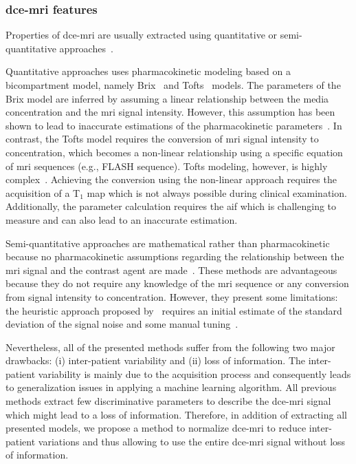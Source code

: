 \documentclass[a4paper,num-refs]{wiley-article}
\begin{document}
\subsubsection{\acs*{dce}-\acs*{mri} features}

Properties of \ac{dce}-\ac{mri} are usually extracted using quantitative or
semi-quantitative approaches~\cite{lemaitre2015computer}.

Quantitative approaches uses pharmacokinetic modeling based on a
bicompartment model, namely Brix~\cite{brix1991pharmacokinetic} and
Tofts~\cite{tofts1995quantitative} models. The parameters of the Brix model
are inferred by assuming a linear relationship between the media concentration
and the \ac{mri} signal intensity. However, this assumption has been shown to
lead to inaccurate estimations of the pharmacokinetic
parameters~\cite{heilmann2006determination}. In contrast, the Tofts model
requires the conversion of \ac{mri} signal intensity to concentration, which
becomes a non-linear relationship using a specific equation of \ac{mri}
sequences (e.g., FLASH sequence). Tofts modeling, however, is highly
complex~\cite{gliozzi2011phenomenological}. Achieving the conversion using the
non-linear approach requires the acquisition of a T$_1$ map which is not always
possible during clinical examination. Additionally, the parameter calculation
requires the \ac{aif} which is challenging to measure and can also lead to an
inaccurate estimation.

Semi-quantitative approaches are mathematical rather than
pharmacokinetic because no pharmacokinetic assumptions regarding the
relationship between the \ac{mri} signal and the contrast agent are
made~\cite{huisman2001accurate,gliozzi2011phenomenological}. These methods are
advantageous because they do not require any knowledge of the \ac{mri} sequence
or any conversion from signal intensity to concentration. However, they present
some limitations: the heuristic approach proposed
by~\citeauthor{huisman2001accurate} requires an initial estimate of the
standard deviation of the signal noise and some manual
tuning~\cite{huisman2001accurate}.

Nevertheless, all of the presented methods suffer from the following two major
drawbacks: (i) inter-patient variability and (ii) loss of information. The
inter-patient variability is mainly due to the acquisition process and
consequently leads to generalization issues in applying a machine learning
algorithm. All previous methods extract few discriminative parameters to
describe the \ac{dce}-\ac{mri} signal which might lead to a loss of
information. Therefore, in addition of extracting all presented models, we
propose a method to normalize \ac{dce}-\ac{mri} to reduce inter-patient
variations and thus allowing to use the entire \ac{dce}-\ac{mri} signal without
loss of information.
\end{document}
